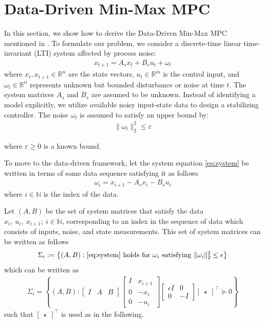 \section{Data-Driven Min-Max MPC}
\label{sec:data_driven_mpc}
In this section, we show how to derive the Data-Driven Min-Max MPC mentioned in \cite{xie2024}.
To formulate our problem, we consider a discrete-time  linear time-invariant (LTI) system affected by process noise:
	\begin{align*}
		x_{t+1} = A_s x_t + B_s u_t + \omega_t
	\end{align*}
where \(x_t, x_{t+1} \in \mathbb{R}^n\) are the state vectors, \(u_t \in \mathbb{R}^m\) is the control input, and \(\omega_t \in \mathbb{R}^n\) represents unknown but bounded disturbance or noise at time \(t\).
The system matrices \(A_s\) and \(B_s\) are assumed to be unknown.
Instead of identifying a model explicitly, we utilize available noisy input-state data to design a stabilizing controller.
The noise \(\omega_t\) is assumed to satisfy an upper bound by:
\begin{align*}
\|\omega_t\|_2^2 \leq \varepsilon
\end{align*}

where \(\varepsilon \geq 0\) is a known bound.

To move to the data-driven framework, let the system equation \ref{eq:system} be written in terms of some data sequence satisfying it as follows
	\begin{align*}
		\omega_i = x_{i+1} - A_s x_i - B_s u_i
	\end{align*}
where $i \in \mathbb{N}$ is the index of the data.

Let \(\left(A, B\right)\) be the set of system matrices that satisfy the data \(x_i,\ u_i,\ x_{i+1};\ i \in \mathbb{N}\), corresponding to an index in the sequence of data which consists of inputs, noise, and state measurements. This set of system matrices can be written as follows
	\begin{align*}
		\Sigma_i := \left\{ \left( A, B \right) : \eqref{eq:system} \text{ holds for } \omega_i \text{ satisfying } \|\omega_i\|_2^2 \leq \epsilon \right\}
	\end{align*}
which can be written as
	\begin{align*}
		\Sigma_i = \left\{ \left( A, B \right) :
		\begin{bmatrix} I & A & B \end{bmatrix}
		\begin{bmatrix}
			I & x_{i+1} \\
			0 & -x_i \\
			0 & -u_i
		\end{bmatrix}
		\begin{bmatrix}
			\epsilon I & 0 \\
			0 & -I
		\end{bmatrix}
		\begin{bmatrix}
			\star
		\end{bmatrix}^\top \succeq 0
		\right\}
\end{align*}
such that $\begin{bmatrix}	\star \end{bmatrix}^\top$ is used as in the following.


